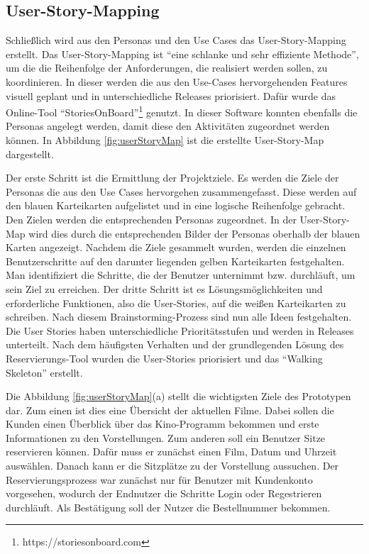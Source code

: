 	\subsection{User-Story-Mapping}
	Schließlich wird aus den Personas und den Use Cases das User-Story-Mapping erstellt. Das User-Story-Mapping ist \enquote{eine schlanke und sehr effiziente Methode}, \autocite[][S. 143]{userStory} um die die Reihenfolge der Anforderungen, die realisiert werden sollen, zu koordinieren. In dieser werden die aus den Use-Cases hervorgehenden Features visuell geplant und in unterschiedliche Releases priorisiert. Dafür wurde das Online-Tool \enquote{StoriesOnBoard}\footnote{https://storiesonboard.com} genutzt. In dieser Software konnten ebenfalls die Personas angelegt werden, damit diese den Aktivitäten zugeordnet werden können. In Abbildung \vref{fig:userStoryMap} ist die erstellte User-Story-Map dargestellt.
	
	Der erste Schritt ist die Ermittlung der Projektziele. Es werden die Ziele der Personas die aus den Use Cases hervorgehen zusammengefasst. Diese werden auf den blauen Karteikarten aufgelistet und in eine logische Reihenfolge gebracht. Den Zielen werden die entsprechenden Personas zugeordnet. In der User-Story-Map wird dies durch die entsprechenden Bilder der Personas oberhalb der blauen Karten angezeigt. Nachdem die Ziele gesammelt wurden, werden die einzelnen Benutzerschritte auf den darunter liegenden gelben Karteikarten festgehalten. Man identifiziert die Schritte, die der Benutzer unternimmt bzw. durchläuft, um sein Ziel zu erreichen. Der dritte Schritt ist es Lösungsmöglichkeiten und erforderliche Funktionen, also die User-Stories, auf die weißen Karteikarten zu schreiben. Nach diesem Brainstorming-Prozess sind nun alle Ideen festgehalten. Die User Stories haben unterschiedliche Prioritätsstufen und werden in Releases unterteilt. Nach dem häufigsten Verhalten und der grundlegenden Lösung des Reservierungs-Tool wurden die User-Stories priorisiert und das \enquote{Walking Skeleton} erstellt. 
	
	 Die Abbildung \ref{fig:userStoryMap}(a) stellt die wichtigsten Ziele des Prototypen dar. Zum einen ist dies eine Übersicht der aktuellen Filme. Dabei sollen die Kunden einen Überblick über das Kino-Programm bekommen und erste Informationen zu den Vorstellungen. Zum anderen soll ein Benutzer Sitze reservieren können. Dafür muss er zunächst einen Film, Datum und Uhrzeit auswählen. Danach kann er die Sitzplätze zu der Vorstellung aussuchen. Der Reservierungsprozess war zunächst nur für Benutzer mit Kundenkonto vorgesehen, wodurch der Endnutzer die Schritte Login oder Regestrieren durchläuft. Als Bestätigung soll der Nutzer die Bestellnummer bekommen. 
	 
